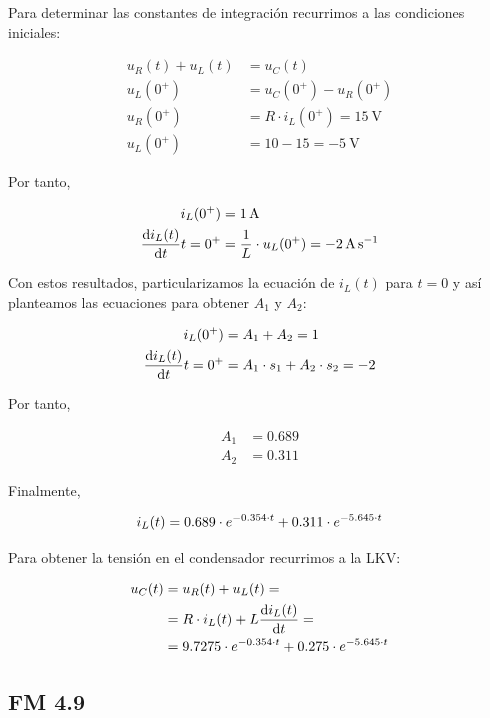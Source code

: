 \documentclass[12pt]{article}
\begin{document}
Para determinar las constantes de integración recurrimos a las condiciones iniciales:

\begin{align*}
  u_R(t) + u_L(t) &= u_C(t)\\
  u_L(0^+) &= u_C(0^+) - u_R(0^+)\\
  u_R(0^+) &= R \cdot i_L(0^+) = \SI{15}{\volt}\\
  u_L(0^+) &= 10 - 15 = \SI{-5}{\volt}
\end{align*}

Por tanto,

\begin{align*}
  i_L(0^+) &= \SI{1}{\ampere}\\
  \diff{i_L(t)}{t}{t = 0^+} &= \frac{1}{L} \cdot u_L(0^+) = \SI{-2}{\ampere\per\second}
\end{align*}

Con estos resultados, particularizamos la ecuación de $i_L(t)$ para $t = 0$ y así planteamos las ecuaciones para obtener $A_1$ y $A_2$:

\begin{align*}
  i_L(0^+) &= A_1 + A_2 = 1\\
  \diff{i_L(t)}{t}{t = 0^+} &= A_1 \cdot s_1 + A_2 \cdot s_2 = -2
\end{align*}

Por tanto,

\begin{align*}
  A_1 &= 0.689\\
  A_2 &= 0.311
\end{align*}

Finalmente,

\begin{equation*}
  i_L(t) = 0.689 \cdot e^{-0.354 \cdot t} + 0.311 \cdot e^{-5.645 \cdot t}\\
\end{equation*}

Para obtener la tensión en el condensador recurrimos a la LKV:

\begin{align*}
  u_C(t) &= u_R(t) + u_L(t) = \\
         &= R \cdot i_L(t) + L \diff{i_L(t)}{t} = \\
  &= 9.7275 \cdot e^{-0.354 \cdot t} + 0.275 \cdot e^{-5.645 \cdot t}
\end{align*}

\clearpage

\subsection{FM 4.9}
\end{document}

